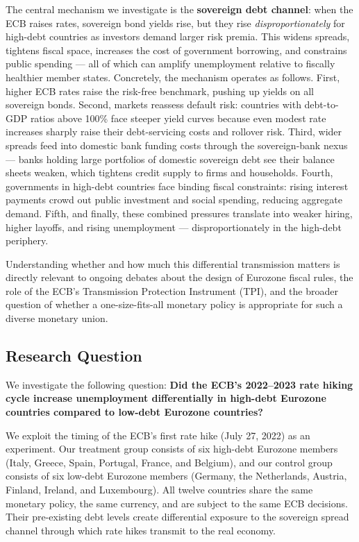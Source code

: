\documentclass[12pt,a4paper]{article}
\begin{document}
The central mechanism we investigate is the \textbf{sovereign debt channel}: when the ECB raises rates, sovereign bond yields rise, but they rise \textit{disproportionately} for high-debt countries as investors demand larger risk premia. This widens spreads, tightens fiscal space, increases the cost of government borrowing, and constrains public spending --- all of which can amplify unemployment relative to fiscally healthier member states. Concretely, the mechanism operates as follows. First, higher ECB rates raise the risk-free benchmark, pushing up yields on all sovereign bonds. Second, markets reassess default risk: countries with debt-to-GDP ratios above 100\% face steeper yield curves because even modest rate increases sharply raise their debt-servicing costs and rollover risk. Third, wider spreads feed into domestic bank funding costs through the sovereign-bank nexus --- banks holding large portfolios of domestic sovereign debt see their balance sheets weaken, which tightens credit supply to firms and households. Fourth, governments in high-debt countries face binding fiscal constraints: rising interest payments crowd out public investment and social spending, reducing aggregate demand. Fifth, and finally, these combined pressures translate into weaker hiring, higher layoffs, and rising unemployment --- disproportionately in the high-debt periphery.

Understanding whether and how much this differential transmission matters is directly relevant to ongoing debates about the design of Eurozone fiscal rules, the role of the ECB's Transmission Protection Instrument (TPI), and the broader question of whether a one-size-fits-all monetary policy is appropriate for such a diverse monetary union.

\subsection{Research Question}

We investigate the following question: \textbf{Did the ECB's 2022--2023 rate hiking cycle increase unemployment differentially in high-debt Eurozone countries compared to low-debt Eurozone countries?}

We exploit the timing of the ECB's first rate hike (July 27, 2022) as an experiment. Our treatment group consists of six high-debt Eurozone members (Italy, Greece, Spain, Portugal, France, and Belgium), and our control group consists of six low-debt Eurozone members (Germany, the Netherlands, Austria, Finland, Ireland, and Luxembourg). All twelve countries share the same monetary policy, the same currency, and are subject to the same ECB decisions. Their pre-existing debt levels create differential exposure to the sovereign spread channel through which rate hikes transmit to the real economy.
\end{document}
